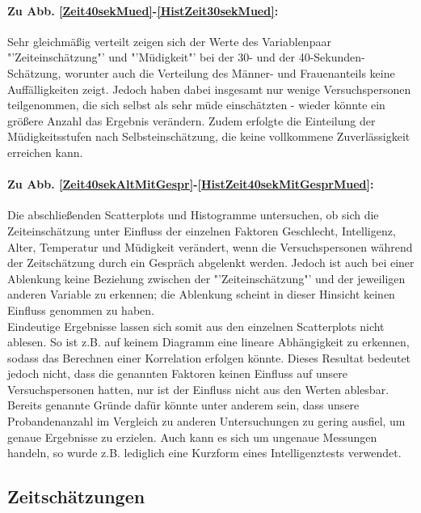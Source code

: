 \documentclass{Paper}
\begin{document}
\paragraph{Zu Abb. \ref{Zeit40sekMued}-\ref{HistZeit30sekMued}:} Sehr gleichmäßig verteilt zeigen sich der Werte des Variablenpaar "'Zeiteinschätzung"' und "'Müdigkeit"' bei der 30- und der 40-Sekunden-Schätzung, worunter auch die Verteilung des Männer- und Frauenanteils keine Auffälligkeiten zeigt. Jedoch haben dabei insgesamt nur wenige Versuchspersonen teilgenommen, die sich selbst als sehr müde einschätzten - wieder könnte ein größere Anzahl das Ergebnis verändern. Zudem erfolgte die Einteilung der Müdigkeitsstufen nach Selbsteinschätzung, die keine vollkommene Zuverlässigkeit erreichen kann. 

\paragraph{Zu Abb. \ref{Zeit40sekAltMitGespr}-\ref{HistZeit40sekMitGesprMued}:} Die abschließenden Scatterplots und Histogramme untersuchen, ob sich die Zeiteinschätzung unter Einfluss der einzelnen Faktoren Geschlecht, Intelligenz, Alter, Temperatur und Müdigkeit verändert, wenn die Versuchspersonen während der Zeitschätzung durch ein Gespräch abgelenkt werden. Jedoch ist auch bei einer Ablenkung keine Beziehung zwischen der "'Zeiteinschätzung"' und der jeweiligen anderen Variable zu erkennen; die Ablenkung scheint in dieser Hinsicht keinen Einfluss genommen zu haben.\\ 

Eindeutige Ergebnisse lassen sich somit aus den einzelnen Scatterplots nicht ablesen. So ist z.B. auf keinem Diagramm eine lineare Abhängigkeit zu erkennen, sodass das Berechnen einer Korrelation erfolgen könnte. Dieses Resultat bedeutet jedoch nicht, dass die genannten Faktoren keinen Einfluss auf unsere Versuchspersonen hatten, nur ist der Einfluss nicht aus den Werten ablesbar. Bereits genannte Gründe dafür könnte unter anderem sein, dass unsere Probandenanzahl im Vergleich zu anderen Untersuchungen zu gering ausfiel, um genaue Ergebnisse zu erzielen. Auch kann es sich um ungenaue Messungen handeln, so wurde z.B. lediglich eine Kurzform eines Intelligenztests verwendet.

\subsection{Zeitschätzungen}
\end{document}
